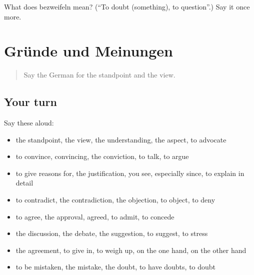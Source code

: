 \begin{tcolorbox}[breakable,colback=teal!4,colframe=teal!35!black,title={Before you move on}]
What does bezweifeln mean? (\textquotedblleft{}To doubt (something), to question\textquotedblright{}.) Say it once more.
\end{tcolorbox}
\section[(dialogue)]{Gründe und Meinungen}

\label{lesson:GE-R337-review-330-337}



\begin{quote}
Say the German for the standpoint and the view.
\end{quote}

\subsection*{Your turn}
Say these aloud:

\begin{itemize}
\raggedright
  \item the standpoint, the view, the understanding, the aspect, to advocate
  \item to convince, convincing, the conviction, to talk, to argue
  \item to give reasons for, the justification, you see, especially since, to explain in detail
  \item to contradict, the contradiction, the objection, to object, to deny
  \item to agree, the approval, agreed, to admit, to concede
  \item the discussion, the debate, the suggestion, to suggest, to stress
  \item the agreement, to give in, to weigh up, on the one hand, on the other hand
  \item to be mistaken, the mistake, the doubt, to have doubts, to doubt
\end{itemize}

